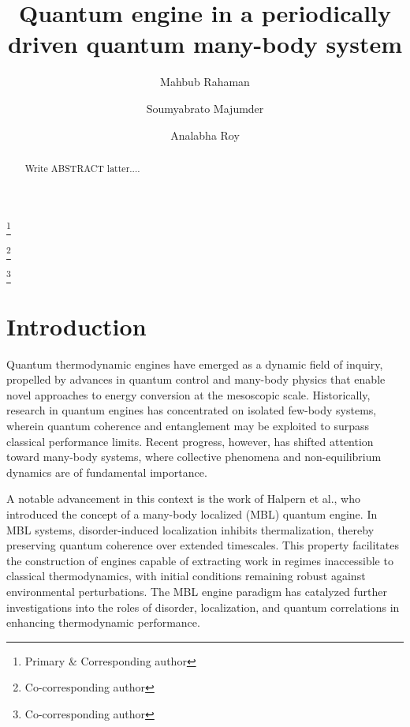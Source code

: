 \documentclass[%
reprint,
superscriptaddress,
amsmath,amssymb,
aps,
prb,
showkeys,
]{revtex4-2}
\begin{document}

\title{Quantum engine in a periodically driven quantum many-body system}%

\author{Mahbub Rahaman}
\thanks{Primary \& Corresponding author}
\author{Soumyabrato Majumder}
\thanks{Co-corresponding author}
\author{Analabha Roy}
\thanks{Co-corresponding author}


\begin{abstract}
    Write ABSTRACT latter....
\end{abstract}

\maketitle

\section{Introduction}
Quantum thermodynamic engines have emerged as a dynamic field of inquiry, propelled by advances in quantum control and many-body physics that enable novel approaches to energy conversion at the mesoscopic scale. Historically, research in quantum engines has concentrated on isolated few-body systems, wherein quantum coherence and entanglement may be exploited to surpass classical performance limits. Recent progress, however, has shifted attention toward many-body systems, where collective phenomena and non-equilibrium dynamics are of fundamental importance.

A notable advancement in this context is the work of Halpern et al., who introduced the concept of a many-body localized (MBL) quantum engine. In MBL systems, disorder-induced localization inhibits thermalization, thereby preserving quantum coherence over extended timescales. This property facilitates the construction of engines capable of extracting work in regimes inaccessible to classical thermodynamics, with initial conditions remaining robust against environmental perturbations. The MBL engine paradigm has catalyzed further investigations into the roles of disorder, localization, and quantum correlations in enhancing thermodynamic performance.
\end{document}
